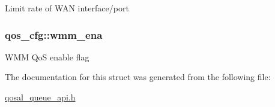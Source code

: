 Limit rate of W\-A\-N interface/port \hypertarget{structqos__cfg_a79c7b6853d2eb702f01a5f9412acc887}{
\subsubsection[{wmm\-\_\-ena}]{ qos\-\_\-cfg\-::wmm\-\_\-ena}}\label{structqos__cfg_a79c7b6853d2eb702f01a5f9412acc887}
W\-M\-M Qo\-S enable flag 

The documentation for this struct was generated from the following file\-:\begin{DoxyCompactItemize}
\item 
\hyperlink{qosal__queue__api_8h}{qosal\-\_\-queue\-\_\-api.\-h}\end{DoxyCompactItemize}
